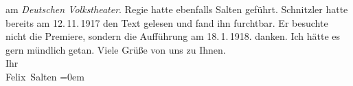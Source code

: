 \begin{ledgroupsized}[t]{13cm}
{{{                  am \emph{Deutschen Volkstheater}. Regie hatte ebenfalls
                  Salten geführt. Schnitzler hatte
               bereits am 12. 11. 1917 den Text gelesen
                  und fand ihn furchtbar. Er besuchte nicht die Premiere, sondern die Aufführung am 18. 1. 1918.}}}\label{K_L03567-1h} danken. Ich hätte es gern
               mündlich getan. \pend
           \pstart
           Viele Grüße von uns zu Ihnen.
               {\\[\baselineskip]}Ihr
               {\\[\baselineskip]}\spacefill\mbox{Felix Salten}\pend
           \leftskip=0em{}
         
         \endnumbering{}\end{ledgroupsized}\begin{anhang}\end{anhang}\newcommand{\dateiname}{L03567}\newcommand{\titel}{Felix Salten an Arthur Schnitzler, 27. 12. 1917}\newcommand{\editorInnen}{Martin Anton Müller und Laura Untner}
      